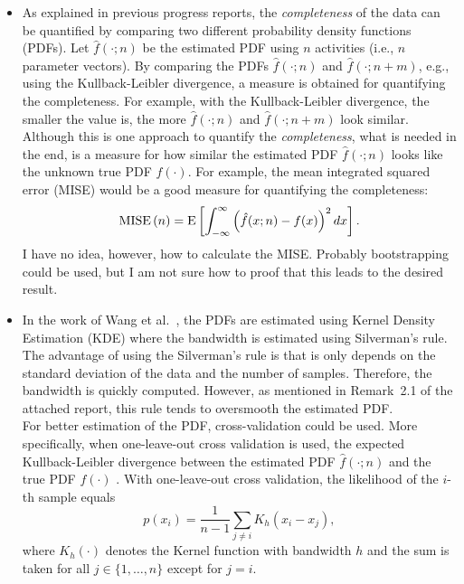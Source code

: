 \documentclass[10pt,final,a4paper,oneside,onecolumn]{article}
\newcommand{\expectation}[1]{\textup{E} \left[ #1 \right]}
\newcommand{\mise}[1]{\textup{MISE} \left( #1 \right)}
\begin{document}
\begin{itemize}
	\item As explained in previous progress reports, the \emph{completeness} of the data can be quantified by comparing two different probability density functions (PDFs). Let $\hat{f}(\cdot; n)$ be the estimated PDF using $n$ activities (i.e., $n$ parameter vectors). By comparing the PDFs $\hat{f}(\cdot; n)$ and $\hat{f}(\cdot; n+m)$, e.g., using the Kullback-Leibler divergence, a measure is obtained for quantifying the completeness. For example, with the Kullback-Leibler divergence, the smaller the value is, the more $\hat{f}(\cdot;n)$ and $\hat{f}(\cdot;n+m)$ look similar. \\
	Although this is one approach to quantify the \emph{completeness}, what is needed in the end, is a measure for how similar the estimated PDF $\hat{f}(\cdot; n)$ looks like the unknown true PDF $f(\cdot)$. For example, the mean integrated squared error (MISE) \cite{turlach1993bandwidthselection} would be a good measure for quantifying the completeness:
	\begin{equation} \label{eq:mise}
		\mise{n} = \expectation{\int_{-\infty}^{\infty} \left( \hat{f}(x;n) - f(x) \right)^2 dx}.
	\end{equation}
	I have no idea, however, how to calculate the MISE. Probably bootstrapping \cite{efron1994bootstrap} could be used, but I am not sure how to proof that this leads to the desired result.
	
	\item In the work of Wang et al.\ \cite{wang2017much}, the PDFs are estimated using Kernel Density Estimation (KDE) where the bandwidth is estimated using Silverman's rule. The advantage of using the Silverman's rule is that is only depends on the standard deviation of the data and the number of samples. Therefore, the bandwidth is quickly computed. However, as mentioned in Remark~2.1 of the attached report, this rule tends to oversmooth the estimated PDF. \\
	For better estimation of the PDF, cross-validation could be used. More specifically, when one-leave-out cross validation is used, the expected Kullback-Leibler divergence between the estimated PDF $\hat{f}(\cdot;n)$ and the true PDF $f(\cdot)$ \cite{turlach1993bandwidthselection}. With one-leave-out cross validation, the likelihood of the $i$-th sample equals
	\begin{equation} \label{eq:sample likelihood}
		p(x_i) = \frac{1}{n-1} \sum_{j \ne i} K_h(x_i - x_j),
	\end{equation}
	where $K_h(\cdot)$ denotes the Kernel function with bandwidth $h$ and the sum is taken for all $j\in \{1, \ldots, n\}$ except for $j=i$. 
	

\end{itemize}
\end{document}
